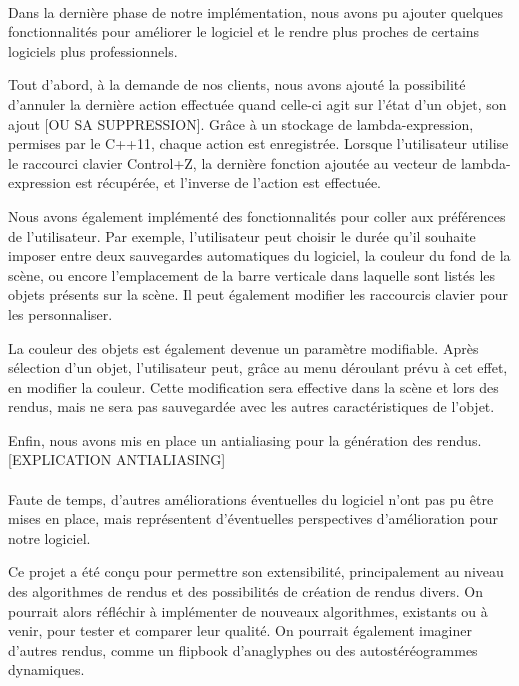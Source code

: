 \paragraph{}
Dans la dernière phase de notre implémentation, nous avons pu ajouter quelques fonctionnalités pour améliorer le logiciel et le rendre plus proches de certains logiciels plus professionnels.

Tout d'abord, à la demande de nos clients, nous avons ajouté la possibilité d'annuler la dernière action effectuée quand celle-ci agit sur l'état d'un objet, son ajout [OU SA SUPPRESSION]. Grâce à un stockage de lambda-expression, permises par le C++11, chaque action est enregistrée. Lorsque l'utilisateur utilise le raccourci clavier Control+Z, la dernière fonction ajoutée au vecteur de lambda-expression est récupérée, et l'inverse de l'action est effectuée.

Nous avons également implémenté des fonctionnalités pour coller aux préférences de l'utilisateur. Par exemple, l'utilisateur peut choisir le durée qu'il souhaite imposer entre deux sauvegardes automatiques du logiciel, la couleur du fond de la scène, ou encore l'emplacement de la barre verticale dans laquelle sont listés les objets présents sur la scène. Il peut également modifier les raccourcis clavier pour les personnaliser.

La couleur des objets est également devenue un paramètre modifiable. Après sélection d'un objet, l'utilisateur peut, grâce au menu déroulant prévu à cet effet, en modifier la couleur. Cette modification sera effective dans la scène et lors des rendus, mais ne sera pas sauvegardée avec les autres caractéristiques de l'objet.

Enfin, nous avons mis en place un antialiasing pour la génération des rendus.
[EXPLICATION ANTIALIASING]


\paragraph{}
Faute de temps, d'autres améliorations éventuelles du logiciel n'ont pas pu être mises en place, mais représentent d'éventuelles perspectives d'amélioration pour notre logiciel.

Ce projet a été conçu pour permettre son extensibilité, principalement au niveau des algorithmes de rendus et des possibilités de création de rendus divers. On pourrait alors réfléchir à implémenter de nouveaux algorithmes, existants ou à venir, pour tester et comparer leur qualité. On pourrait également imaginer d'autres rendus, comme un flipbook d'anaglyphes ou des autostéréogrammes dynamiques.

